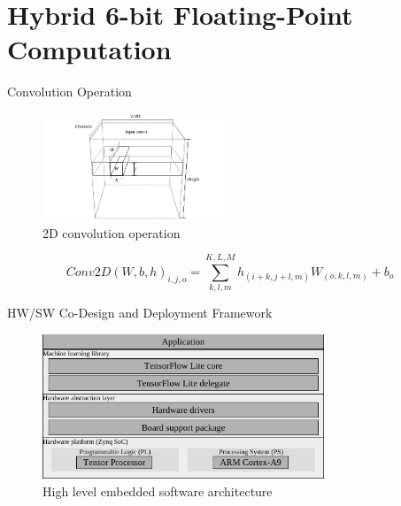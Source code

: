 \section{Hybrid 6-bit Floating-Point Computation}
\tableofcontents[currentsection]

\begin{frame}{Convolution Operation}
	\begin{figure}
		\centering
		\includegraphics[width=0.5\textwidth]{../figures/convolution.pdf}
		\caption{ 2D convolution operation}
	\end{figure}
	
	
	{\scriptsize
		\[
Conv2D\left(W,b,h\right)_{i,j,o}=\sum_{k,l,m}^{K,L,M} h_{(i+k,j+l,m)} W_{(o,k,l,m)}+b_{o}
		\]
	}
\end{frame}

\begin{frame}{HW/SW Co-Design and Deployment Framework}

			\begin{figure}
				\includegraphics[width=0.75\textwidth]{../chapters/cnn_accelerator/figures/sw_stack.pdf}
				\caption{ High level embedded software architecture}
			\end{figure}

\end{frame}

